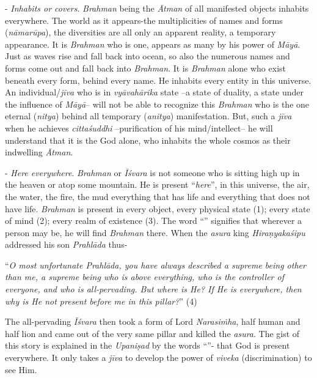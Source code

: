 - \emph{Inhabits or covers}. \emph{Brahman} being the \emph{Ātman} of all manifested objects inhabits everywhere. The world as it appears-the multiplicities of names and forms (\emph{nāmarūpa}), the diversities are all only an apparent reality, a temporary appearance. It is \emph{Brahman} who is one, appears as many by his power of \emph{Māyā}. Just as waves rise and fall back into ocean, so also the numerous names and forms come out and fall back into \emph{Brahman}. It is \emph{Brahman} alone who exist beneath every form, behind every name. He inhabits every entity in this universe. An individual/\emph{jīva} who is in \emph{vyāvahārika} state --a state of duality, a state under the influence of \emph{Māyā}-- will not be able to recognize this \emph{Brahman} who is the one eternal (\emph{nitya}) behind all temporary (\emph{anitya}) manifestation. But, such a \emph{jīva} when he achieves \emph{cittaśuddhi} --purification of his mind/intellect-- he will understand that it is the God alone, who inhabits the whole cosmos as their indwelling \emph{Ātman}.

 - \emph{Here everywhere}. \emph{Brahman} or \emph{Īśvara} is not someone who is sitting high up in the heaven or atop some mountain. He is present ``\emph{here}'', in this universe, the air, the water, the fire, the mud everything that has life and everything that does not have life. \emph{Brahman} is present in every object, every physical state (1); every state of mind (2); every realm of existence (3). The word ``'' signifies that wherever a person may be, he will find \emph{Brahman} there. When the \emph{asura} king \emph{Hiraṇyakaśipu} addressed his son \emph{Prahlāda} thus-

``\emph{O most unfortunate Prahlāda, you have always described a supreme being other than me, a supreme being who is above everything, who is the controller of everyone, and who is all-pervading. But where is He? If He is everywhere, then why is He not present before me in this pillar?}'' (4)

The all-pervading \emph{Īśvara} then took a form of Lord \emph{Narasiṁha}, half human and half lion and came out of the very same pillar and killed the \emph{asura}. The gist of this story is explained in the \emph{Upaniṣad} by the words ``''- that God is present everywhere. It only takes a \emph{jīva} to develop the power of \emph{viveka} (discrimination) to see Him.
\vskip 1.1pt

